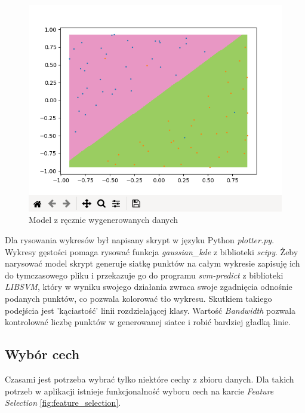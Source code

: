 \documentclass[paper=a4, fontsize=11pt]{scrartcl} %
\numberwithin{equation}{section} %
\numberwithin{figure}{section} %
\begin{document}
    \begin{figure}[H]
        \begin{center}
            \includegraphics[scale=0.65]{./img/gen_plot_model.png}
            \caption{Model z ręcznie wygenerowanych danych}
            \label{fig:gen_plot_model}
        \end{center}
    \end{figure}

    \par Dla rysowania wykresów był napisany skrypt w języku Python \textit{plotter.py}.
    Wykresy gęstości pomaga rysować funkcja \textit{gaussian\_kde} z biblioteki \textit{scipy}.
    Żeby narysować model skrypt generuje siatkę punktów na całym wykresie zapisuję ich do
    tymczasowego pliku i przekazuje go do programu \textit{svm-predict} z biblioteki
    \textit{LIBSVM}, który w wyniku swojego działania zwraca swoje zgadnięcia odnośnie podanych
    punktów, co pozwala kolorować tło wykresu. Skutkiem takiego podejścia jest 'kąciastość'
    linii rozdzielającej klasy. Wartość \textit{Bandwidth} pozwala kontrolować liczbę punktów w
    generowanej siatce i robić bardziej gładką linie.

\newpage
\subsection{Wybór cech}
    \par Czasami jest potrzeba wybrać tylko niektóre cechy z zbioru danych. Dla takich potrzeb
    w aplikacji istnieje funkcjonalność wyboru cech na karcie \textit{Feature Selection}
    \ref{fig:feature_selection}.
\end{document}
